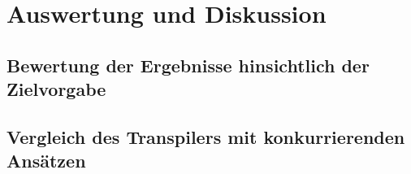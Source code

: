 \chapter{Auswertung und Diskussion}

\section{Bewertung der Ergebnisse hinsichtlich der Zielvorgabe}
\section{Vergleich des Transpilers mit konkurrierenden Ansätzen}
